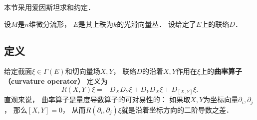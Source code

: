

本节采用爱因斯坦求和约定．

设$M$是$n$维微分流形， $E$是其上秩为$k$的光滑向量丛． 设给定了$E$上的联络$D$．

\subsection{定义}

给定截面$\xi\in\Gamma(E)$和切向量场$X,Y$， 联络$D$的沿着$X,Y$作用在$\xi$上的\textbf{曲率算子 （curvature operator）} 定义为
$$
R(X,Y)\xi=-D_XD_Y\xi+D_YD_X\xi+D_{[X,Y]}\xi.
$$
直观来说， 曲率算子是量度导数算子的可对易性的： 如果取$X,Y$为坐标向量$\partial_i,\partial_j$， 那么$[X,Y]=0$， 从而$R(\partial_i,\partial_j)\xi$就是沿着坐标方向的二阶导数之差．


